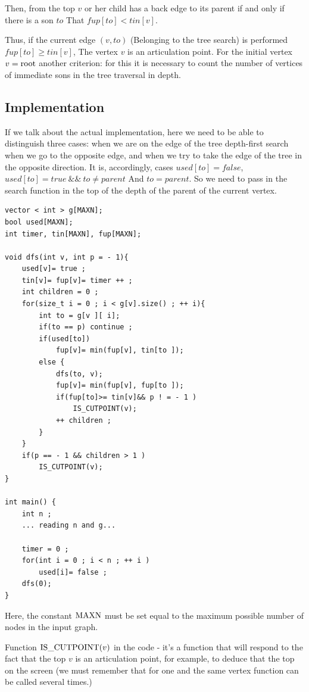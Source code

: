 Then, from the top $v$ or her child has a back edge to its parent if and only if there is a son $to$ That $fup [to] <tin [v]$.

Thus, if the current edge $(v, to)$ (Belonging to the tree search) is performed $fup [to] \ge tin [v]$, The vertex $v$ is an articulation point. For the initial vertex $v = {\rm root}$ another criterion: for this it is necessary to count the number of vertices of immediate sons in the tree traversal in depth.

\subsection{ Implementation }

If we talk about the actual implementation, here we need to be able to distinguish three cases: when we are on the edge of the tree depth-first search when we go to the opposite edge, and when we try to take the edge of the tree in the opposite direction. It is, accordingly, cases $used [to] = false$, $used [to] = true ~ \& \& ~ to \ne parent$ And $to = parent$. So we need to pass in the search function in the top of the depth of the parent of the current vertex.

\begin{verbatim}
vector < int > g[MAXN];
bool used[MAXN];
int timer, tin[MAXN], fup[MAXN];
 
void dfs(int v, int p = - 1){
    used[v]= true ;
    tin[v]= fup[v]= timer ++ ;
    int children = 0 ;
    for(size_t i = 0 ; i < g[v].size() ; ++ i){
        int to = g[v ][ i];
        if(to == p) continue ;
        if(used[to])
            fup[v]= min(fup[v], tin[to ]);
        else {
            dfs(to, v);
            fup[v]= min(fup[v], fup[to ]);
            if(fup[to]>= tin[v]&& p ! = - 1 )
                IS_CUTPOINT(v);
            ++ children ;
        }
    }
    if(p == - 1 && children > 1 )
        IS_CUTPOINT(v);
}
 
int main() {
    int n ;
    ... reading n and g...
 
    timer = 0 ;
    for(int i = 0 ; i < n ; ++ i )
        used[i]= false ;
    dfs(0);
} 
\end{verbatim}
Here, the constant $\rm MAXN$ must be set equal to the maximum possible number of nodes in the input graph.

Function ${\rm IS \_CUTPOINT} (v)$ in the code - it's a function that will respond to the fact that the top $v$ is an articulation point, for example, to deduce that the top on the screen (we must remember that for one and the same vertex function can be called several times.)


